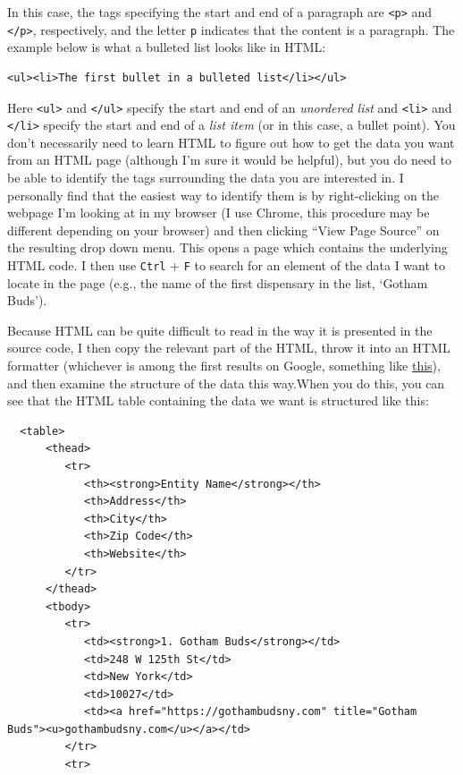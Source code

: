 \documentclass[
  letterpaper,
]{book}
\begin{document}
In this case, the tags specifying the start and end of a paragraph are
\texttt{\textless{}p\textgreater{}} and
\texttt{\textless{}/p\textgreater{}}, respectively, and the letter
\texttt{p} indicates that the content is a paragraph. The example below
is what a bulleted list looks like in HTML:

\begin{verbatim}
<ul><li>The first bullet in a bulleted list</li></ul>
\end{verbatim}

Here \texttt{\textless{}ul\textgreater{}} and
\texttt{\textless{}/ul\textgreater{}} specify the start and end of an
\emph{unordered list} and \texttt{\textless{}li\textgreater{}} and
\texttt{\textless{}/li\textgreater{}} specify the start and end of a
\emph{list item} (or in this case, a bullet point). You don't
necessarily need to learn HTML to figure out how to get the data you
want from an HTML page (although I'm sure it would be helpful), but you
do need to be able to identify the tags surrounding the data you are
interested in. I personally find that the easiest way to identify them
is by right-clicking on the webpage I'm looking at in my browser (I use
Chrome, this procedure may be different depending on your browser) and
then clicking ``View Page Source'' on the resulting drop down menu. This
opens a page which contains the underlying HTML code. I then use
\texttt{Ctrl} + \texttt{F} to search for an element of the data I want
to locate in the page (e.g., the name of the first dispensary in the
list, `Gotham Buds').

Because HTML can be quite difficult to read in the way it is presented
in the source code, I then copy the relevant part of the HTML, throw it
into an HTML formatter (whichever is among the first results on Google,
something like
\href{https://www.freeformatter.com/html-formatter.html}{this}), and
then examine the structure of the data this way.When you do this, you
can see that the HTML table containing the data we want is structured
like this:

\begin{verbatim}
  <table>
      <thead>
         <tr>
            <th><strong>Entity Name</strong></th>
            <th>Address</th>
            <th>City</th>
            <th>Zip Code</th>
            <th>Website</th>
         </tr>
      </thead>
      <tbody>
         <tr>
            <td><strong>1. Gotham Buds</strong></td>
            <td>248 W 125th St</td>
            <td>New York</td>
            <td>10027</td>
            <td><a href="https://gothambudsny.com" title="Gotham Buds"><u>gothambudsny.com</u></a></td>
         </tr>
         <tr>
\end{verbatim}
\end{document}
